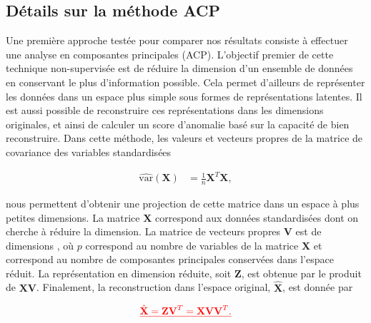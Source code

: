 \subsection{Détails sur la méthode ACP} \label{acp}

Une première approche testée pour comparer nos résultats consiste à effectuer une analyse en composantes principales (ACP). L'objectif premier de cette technique non-supervisée est de réduire la dimension d'un ensemble de données en conservant le plus d'information possible. Cela permet d'ailleurs de représenter les données dans un espace plus simple sous formes de représentations latentes. Il est aussi possible de reconstruire ces représentations dans les dimensions originales, \DIFaddbegin {}\DIFaddend et ainsi de calculer un score d'anomalie basé sur la capacité de bien reconstruire. Dans cette méthode, les valeurs et vecteurs propres de la matrice de covariance des variables standardisées 

\begin{equation} \label{eq1}
	\begin{split}
		\hat{\text{var}}(\mathbf{X}) & = \frac{1}{n}\mathbf{X}^{T}\mathbf{X},
	\end{split}
\end{equation}


nous permettent d'obtenir une projection de cette matrice dans un espace à plus petites dimensions. La matrice $\mathbf{X}$ correspond aux données standardisées dont on cherche à réduire la dimension. La matrice de vecteurs propres $\mathbf{V}$ est de dimensions \DIFdelbegin {}\DIFdelend \DIFaddbegin {}\DIFaddend , où $p$ correspond au nombre de variables de la matrice $\mathbf{X}$ et \DIFdelbegin {}\DIFdelend \DIFaddbegin {}\DIFaddend correspond au nombre de composantes principales conservées dans l'espace réduit. La représentation en dimension réduite, soit $\mathbf{Z}$, est obtenue par le produit de $\mathbf{X}\mathbf{\mathbf{V}}$. Finalement, la reconstruction dans l'espace original, $\hat{\mathbf{X}}$, est donnée par \DIFaddbegin {}\DIFaddend 

\DIFdelbegin \begin{eqnarray*}
	\DIFdel{\hat{\mathbf{X}} = \mathbf{Z}\mathbf{V}^{T}=\mathbf{X}\mathbf{V}\mathbf{V}^{T}.
}\end{eqnarray*}

